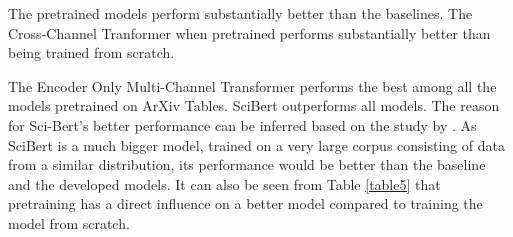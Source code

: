 The pretrained models perform substantially better than the baselines. The Cross-Channel Tranformer when pretrained performs substantially better than being trained from scratch. 

The Encoder Only Multi-Channel Transformer performs the best among all the models pretrained on ArXiv Tables. SciBert outperforms all models. The reason for Sci-Bert's better performance can be inferred based on the study by \cite{hernandez2021scaling}. As SciBert is a much bigger model, trained on a very large corpus consisting of data from a similar distribution, its performance would be better than the baseline and the developed models. It can also be seen from Table \ref{table5} that pretraining has a direct influence on a better model compared to training the model from scratch. 